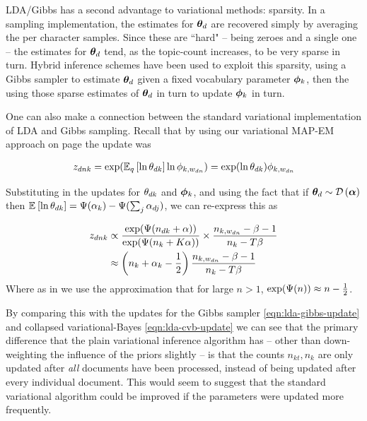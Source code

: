 LDA/Gibbs has a second advantage to variational methods: sparsity. In a sampling implementation, the estimates for ${ \bm \theta_d }$ are recovered simply by averaging the per character samples. Since these are ``hard" -- being zeroes and a single one  -- the estimates for ${ \bm \theta_d }$ tend, as the topic-count increases, to be very sparse in turn. Hybrid inference schemes have been used\cite{Mimno2012a} to exploit this sparsity, using a Gibbs sampler to estimate ${ \bm \theta_d }$ given a fixed vocabulary parameter $\bm \phi_k$, then the using those sparse estimates of ${ \bm \theta_d }$ in turn to update $\bm \phi_k$ in turn.

One can also make a connection between the standard variational implementation of LDA and Gibbs sampling. Recall that by using our variational MAP-EM approach on page \pageref{sec:chap1:lda} the update was

\begin{align}
z_{dnk} = \exp(\mathbb{E}_{ { q } }\left[ \ln { \theta_{dk} } \right] \ln \phi_{k,w_{dn}}) = \exp(\ln { \theta_{dk} })\phi_{k,w_{dn}}
\end{align}

Substituting in the updates for ${ \theta_{dk} }$ and $\bm \phi_k$, and using the fact that if ${ \bm \theta_d } \sim \mathcal{D} \left( {\bm \alpha} \right)$ then $\mathbb{E}_{ {  } }\left[ \ln { \theta_{dk} } \right] = \Psi(\alpha_k) - \Psi(\sum_j \alpha_{dj})$, we can re-express this as

\begin{align}
z_{dnk} &\propto \frac{\exp(\Psi(n_{dk} + \alpha))}{\exp(\Psi(n_k + K \alpha))}\times\frac{n_{k,w_{dn}} - \beta - 1}{n_k - T \beta}  \\
&\approx \left(n_k + \alpha_k - \frac{1}{2}\right) \frac{n_{k,w_{dn}} - \beta - 1}{n_k - T \beta}
\end{align}
Where as in\cite{Asuncion2012} we use the approximation that for large $n > 1$, $\exp(\Psi(n)) \approx n - \frac{1}{2}$. 

By comparing this with the updates for the Gibbs sampler \eqref{eqn:lda-gibbs-update} and collapsed variational-Bayes \eqref{eqn:lda-cvb-update} we can see that the primary difference that the plain variational inference algorithm has -- other than down-weighting the influence of the priors slightly -- is that the counts $n_{kt}, n_{k}$ are only updated after \emph{all} documents have been processed, instead of being updated after every individual document. This would seem to suggest that the standard variational algorithm could be improved if the parameters were updated more frequently.

